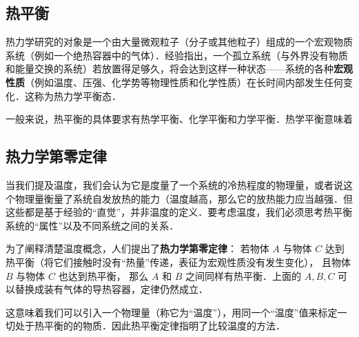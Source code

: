 
\begin{issues}
\issueDraft
\end{issues}

\subsection{热平衡}
热力学研究的对象是一个由大量微观粒子（分子或其他粒子）组成的一个宏观物质系统（例如一个绝热容器中的气体）．经验指出，一个孤立系统（与外界没有物质和能量交换的系统）若放置得足够久，将会达到这样一种状态——系统的各种\textbf{宏观性质}（例如温度、压强、化学势等物理性质和化学性质）在长时间内部发生任何变化．这称为热力学平衡态．

一般来说，热平衡的具体要求有热学平衡、化学平衡和力学平衡．热学平衡意味着

\subsection{热力学第零定律}
当我们提及温度，我们会认为它是度量了一个系统的冷热程度的物理量，或者说这个物理量衡量了系统自发放热的能力（温度越高，那么它的放热能力应当越强．但这些都是基于经验的“直觉”，并非温度的定义．要考虑温度，我们必须思考热平衡系统的“属性”以及不同系统之间的关系．

为了阐释清楚温度概念，人们提出了\textbf{热力学第零定律}：
若物体 $A$ 与物体 $C$ 达到热平衡（将它们接触时没有“热量”传递，表征为宏观性质没有发生变化）， 且物体 $B$ 与物体 $C$ 也达到热平衡， 那么 $A$ 和 $B$ 之间同样有热平衡．上面的 $A,B,C$ 可以替换成装有气体的导热容器，定律仍然成立．

这意味着我们可以引入一个物理量（称它为“温度”），用同一个“温度”值来标定一切处于热平衡的的物质．因此热平衡定律指明了比较温度的方法．

